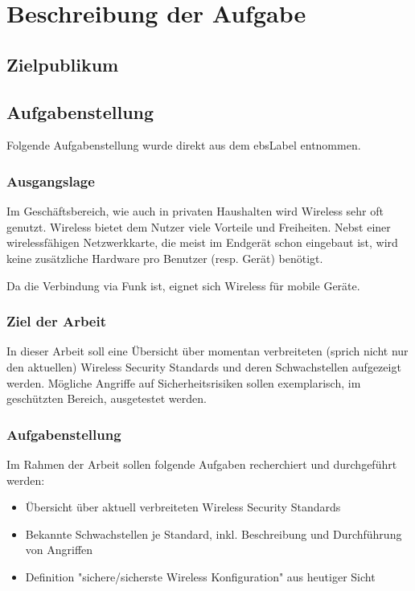 \chapter{Beschreibung der Aufgabe}

\section{Zielpublikum}

\section{Aufgabenstellung}
Folgende Aufgabenstellung wurde direkt aus dem \gls{ebsLabel} entnommen.

\subsection{Ausgangslage}
Im Geschäftsbereich, wie auch in privaten Haushalten wird Wireless sehr oft genutzt.
Wireless bietet dem Nutzer viele Vorteile und Freiheiten. Nebst einer wirelessfähigen Netzwerkkarte, die meist im Endgerät schon eingebaut ist, wird keine zusätzliche Hardware pro Benutzer (resp. Gerät) benötigt.

Da die Verbindung via Funk ist, eignet sich Wireless für mobile Geräte.

\subsection{Ziel der Arbeit}
In dieser Arbeit soll eine Übersicht über momentan verbreiteten (sprich nicht nur den aktuellen) Wireless Security Standards und deren Schwachstellen aufgezeigt werden.
Mögliche Angriffe auf Sicherheitsrisiken sollen exemplarisch, im geschützten Bereich, ausgetestet werden.

\subsection{Aufgabenstellung}
Im Rahmen der Arbeit sollen folgende Aufgaben recherchiert und durchgeführt werden:
\begin{itemize}
	\item Übersicht über aktuell verbreiteten Wireless Security Standards
	\item Bekannte Schwachstellen je Standard, inkl. Beschreibung und Durchführung von Angriffen
	\item Definition "sichere/sicherste Wireless Konfiguration" aus heutiger Sicht
\end{itemize}

